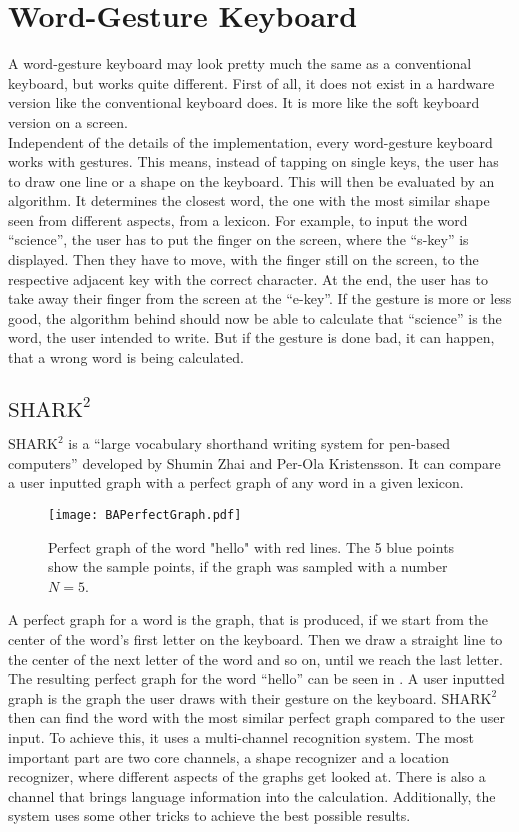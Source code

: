 \section{Word-Gesture Keyboard}
A word-gesture keyboard may look pretty much the same as a conventional keyboard, but works quite different. First of all, it does not exist in a hardware version like the conventional keyboard does. It is more like the soft keyboard version on a screen.\\
Independent of the details of the implementation, every word-gesture keyboard works with gestures. This means, instead of tapping on single keys, the user has to draw one line or a shape on the keyboard. This will then be evaluated by an algorithm. It determines the closest word, the one with the most similar shape seen from different aspects, from a lexicon. For example, to input the word ``science'', the user has to put the finger on the screen, where the ``s-key'' is displayed. Then they have to move, with the finger still on the screen, to the respective adjacent key with the correct character. At the end, the user has to take away their finger from the screen at the ``e-key''. If the gesture is more or less good, the algorithm behind should now be able to calculate that ``science'' is the word, the user intended to write. But if the gesture is done bad, it can happen, that a wrong word is being calculated. 

\subsection{$\text{SHARK}^2$}
\label{SHARK2}
$\text{SHARK}^2$ is a ``large vocabulary shorthand writing system for pen-based computers'' \cite{Kristensson2004SHARK2AL} developed by Shumin Zhai and Per-Ola Kristensson. It can compare a user inputted graph with a perfect graph of any word in a given lexicon.
\begin{figure}[H]
    \centering
    \texttt{[image: BAPerfectGraph.pdf]}
    \caption{Perfect graph of the word "hello" with red lines. The 5 blue points show the sample points, if the graph was sampled with a number $N = 5$.}
    \label{fig:PerfectGraph}
\end{figure}
A perfect graph for a word is the graph, that is produced, if we start from the center of the word's first letter on the keyboard. Then we draw a straight line to the center of the next letter of the word and so on, until we reach the last letter. The resulting perfect graph for the word ``hello'' can be seen in . A user inputted graph is the graph the user draws with their gesture on the keyboard. $\text{SHARK}^2$ then can find the word with the most similar perfect graph compared to the user input. To achieve this, it uses a multi-channel recognition system.  The most important part are two core channels, a shape recognizer and a location recognizer, where different aspects of the graphs get looked at. There is also a channel that brings language information into the calculation. Additionally, the system uses some other tricks to achieve the best possible results.\\
